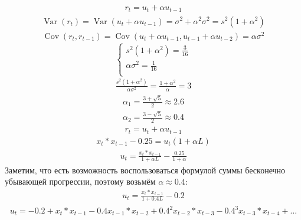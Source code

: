 \documentclass[a4paper,14pt]{article}
\DeclareMathOperator{\Cov}{Cov}
\DeclareMathOperator{\Var}{Var}
\def \s{\sigma}
\begin{document}
\begin{enumerate}
\begin{enumerate}
  \[\begin{aligned}
r_t = u_t + \alpha u_{t-1}
	\end{aligned}\]
   \[\begin{aligned}
\Var(r_t) = \Var(u_t + \alpha u_{t-1}) = \s^2 + \alpha^2\s^2 = s^2(1+\alpha^2)
	\end{aligned}\]
    \[\begin{aligned}
\Cov(r_t, r_{t-1}) = \Cov(u_t + \alpha u_{t-1}, u_{t-1} + \alpha u_{t-2}) = \alpha \s^2 
	\end{aligned}\]
\[
\begin{cases}
s^2(1+\alpha^2) = \frac{3}{16} \\
\alpha \s^2  = \frac{1}{16} \\
\end{cases}
\]
    \[\begin{aligned}
\frac{s^2(1+\alpha^2)}{\alpha \s^2} = \frac{1+\alpha^2}{\alpha}  = 3
	\end{aligned}\]
    \[\begin{aligned}
\alpha_1 = \frac{3+\sqrt{5}}{2} \approx 2.6
	\end{aligned}\]
     \[\begin{aligned}
\alpha_2 = \frac{3-\sqrt{5}}{2} \approx 0.4
	\end{aligned}\]
   \[\begin{aligned}
r_t = u_t + \alpha u_{t-1}
	\end{aligned}\]
    \[\begin{aligned}
x_t * x_{t-1} - 0.25 = u_t(1 + \alpha L)
	\end{aligned}\]
     \[\begin{aligned}
 u_t = \frac{x_t * x_{t-1}}{1 + \alpha L} - \frac{0.25}{1 + \alpha}
	\end{aligned}\]
 Заметим, что есть возможность воспользоваться формулой суммы бесконечно убывающей прогрессии, поэтому возьмём $\alpha \approx 0.4$:
      \[\begin{aligned}
 u_t = \frac{x_t * x_{t-1}}{1 + 0.4 L} - 0.2
	\end{aligned}\]
       \[\begin{aligned}
 u_t = - 0.2 + x_t * x_{t-1} - 0.4x_{t-1} * x_{t-2} + 0.4^2x_{t-2} * x_{t-3} - 0.4^3x_{t-3} * x_{t-4} + ... 
	\end{aligned}\]
 
\end{enumerate}

\end{enumerate}
\end{document}

